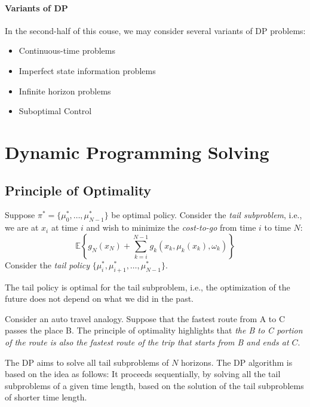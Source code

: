 \paragraph{Variants of DP}
In the second-half of this couse, we may consider several variants of DP problems:
\begin{itemize}
\item
Continuous-time problems
\item
Imperfect state information problems
\item
Infinite horizon problems
\item
Suboptimal Control
\end{itemize}


\section{Dynamic Programming Solving}
\subsection{Principle of Optimality}
Suppose $\pi^*=\{\mu_0^*,\dots,\mu_{N-1}^*\}$ be optimal policy. Consider the \emph{tail subproblem}, i.e., we are at $x_i$ at time $i$ and wish to minimize the \emph{cost-to-go} from time $i$ to time $N$:
\[
\mathbb{E}\left\{
g_N(x_N)
+
\sum_{k=i}^{N-1}g_k(x_k,\mu_k(x_k),\omega_k)
\right\}
\]
Consider the \emph{tail policy} $\{\mu^*_i,\mu_{i+1}^*,\dots,\mu_{N-1}^*\}$.
\begin{theorem}
The tail policy is optimal for the tail subproblem, i.e., the optimization of the future does not depend on what we did in the past.
\end{theorem}
\begin{remark}
Consider an auto travel analogy. Suppose that the fastest route from A to C passes the place B. The principle of optimality highlights that \emph{the B to C portion of the route is also the fastest route of the trip that starts from B and ends at $C$}.
\end{remark}

The DP aims to solve all tail subproblems of $N$ horizons. The DP algorithm is based on the idea as follows:
It proceeds sequentially, by solving all the tail subproblems of a given time length, based on the solution of the tail subproblems of shorter time length.


